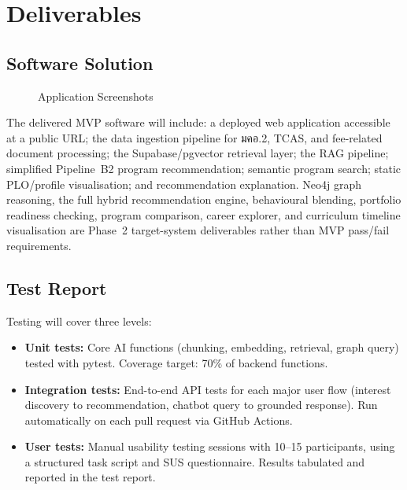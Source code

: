 \chapter{Deliverables}
\label{chap:deliverable}

\section{Software Solution}
\label{section:software-solution}

\begin{figure}[h]
    \centering
    \caption{Application Screenshots}
    \label{fig:app-screenshots}
\end{figure}

The delivered MVP software will include: a deployed web application accessible at a public URL; the data ingestion pipeline for มคอ.2, TCAS, and fee-related document processing; the Supabase/pgvector retrieval layer; the RAG pipeline; simplified Pipeline~B2 program recommendation; semantic program search; static PLO/profile visualisation; and recommendation explanation. Neo4j graph reasoning, the full hybrid recommendation engine, behavioural blending, portfolio readiness checking, program comparison, career explorer, and curriculum timeline visualisation are Phase~2 target-system deliverables rather than MVP pass/fail requirements.

\section{Test Report}
\label{section:test-report}

Testing will cover three levels:

\begin{itemize}[leftmargin=80pt]
    \item \textbf{Unit tests:} Core AI functions (chunking, embedding, retrieval, graph query) tested with pytest. Coverage target: 70\% of backend functions.

    \item \textbf{Integration tests:} End-to-end API tests for each major user flow (interest discovery to recommendation, chatbot query to grounded response). Run automatically on each pull request via GitHub Actions.

    \item \textbf{User tests:} Manual usability testing sessions with 10--15 participants, using a structured task script and SUS questionnaire. Results tabulated and reported in the test report.
\end{itemize}
